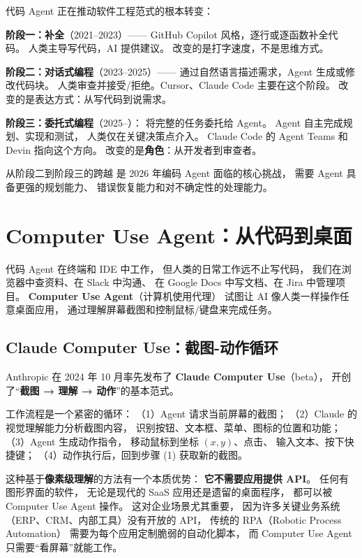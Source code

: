 \begin{warnbox}[编码范式的三个阶段]
代码 Agent 正在推动软件工程范式的根本转变：

\textbf{阶段一：补全}（2021--2023）——
GitHub Copilot 风格，逐行或逐函数补全代码。
人类主导写代码，AI 提供建议。
改变的是打字速度，不是思维方式。

\textbf{阶段二：对话式编程}（2023--2025）——
通过自然语言描述需求，Agent 生成或修改代码块。
人类审查并接受/拒绝。Cursor、Claude Code 主要在这个阶段。
改变的是表达方式：从写代码到说需求。

\textbf{阶段三：委托式编程}（2025--）：
将完整的任务委托给 Agent。
Agent 自主完成规划、实现和测试，
人类仅在关键决策点介入。
Claude Code 的 Agent Teams 和 Devin 指向这个方向。
改变的是\textbf{角色}：从开发者到审查者。

从阶段二到阶段三的跨越
是 2026 年编码 Agent 面临的核心挑战，
需要 Agent 具备更强的规划能力、
错误恢复能力和对不确定性的处理能力。
\end{warnbox}


\section{Computer Use Agent：从代码到桌面}
\label{sec:computer-use-agents}

代码 Agent 在终端和 IDE 中工作，
但人类的日常工作远不止写代码，
我们在浏览器中查资料、在 Slack 中沟通、
在 Google Docs 中写文档、在 Jira 中管理项目。
\textbf{Computer Use Agent}（计算机使用代理）
试图让 AI 像人类一样操作任意桌面应用，
通过理解屏幕截图和控制鼠标/键盘来完成任务。

\subsection{Claude Computer Use：截图-动作循环}

Anthropic 在 2024 年 10 月率先发布了
\textbf{Claude Computer Use}（beta），
开创了“\textbf{截图 → 理解 → 动作}”的基本范式。

工作流程是一个紧密的循环：
（1）Agent 请求当前屏幕的截图；
（2）Claude 的视觉理解能力分析截图内容，
识别按钮、文本框、菜单、图标的位置和功能；
（3）Agent 生成动作指令，
移动鼠标到坐标 $(x, y)$、点击、
输入文本、按下快捷键；
（4）动作执行后，回到步骤 (1) 获取新的截图。

这种基于\textbf{像素级理解}的方法有一个本质优势：
\textbf{它不需要应用提供 API}。
任何有图形界面的软件，
无论是现代的 SaaS 应用还是遗留的桌面程序，
都可以被 Computer Use Agent 操作。
这对企业场景尤其重要，
因为许多关键业务系统
（ERP、CRM、内部工具）没有开放的 API，
传统的 RPA（Robotic Process Automation）
需要为每个应用定制脆弱的自动化脚本，
而 Computer Use Agent 只需要“看屏幕”就能工作。

